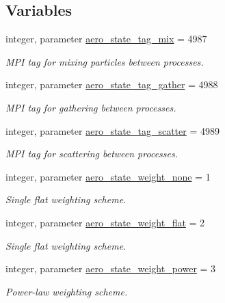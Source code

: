 \subsection*{Variables}
\begin{DoxyCompactItemize}
\item 
integer, parameter \mbox{\hyperlink{namespacepmc__aero__state_a585d061ace6ecfefa6eaadeb8efbeb5d}{aero\+\_\+state\+\_\+tag\+\_\+mix}} = 4987
\begin{DoxyCompactList}\small\item\em M\+PI tag for mixing particles between processes. \end{DoxyCompactList}\item 
integer, parameter \mbox{\hyperlink{namespacepmc__aero__state_a8016b38f6c38806de95b72ffaecbe212}{aero\+\_\+state\+\_\+tag\+\_\+gather}} = 4988
\begin{DoxyCompactList}\small\item\em M\+PI tag for gathering between processes. \end{DoxyCompactList}\item 
integer, parameter \mbox{\hyperlink{namespacepmc__aero__state_a47a81bec0174512abf54faf2673da5c3}{aero\+\_\+state\+\_\+tag\+\_\+scatter}} = 4989
\begin{DoxyCompactList}\small\item\em M\+PI tag for scattering between processes. \end{DoxyCompactList}\item 
integer, parameter \mbox{\hyperlink{namespacepmc__aero__state_afae976ee50ab7c0415628dd99a6feded}{aero\+\_\+state\+\_\+weight\+\_\+none}} = 1
\begin{DoxyCompactList}\small\item\em Single flat weighting scheme. \end{DoxyCompactList}\item 
integer, parameter \mbox{\hyperlink{namespacepmc__aero__state_a72b0c9b3118a486936fe3c50c4d908f6}{aero\+\_\+state\+\_\+weight\+\_\+flat}} = 2
\begin{DoxyCompactList}\small\item\em Single flat weighting scheme. \end{DoxyCompactList}\item 
integer, parameter \mbox{\hyperlink{namespacepmc__aero__state_a2c80e8cba61697786d2302e44cd041bd}{aero\+\_\+state\+\_\+weight\+\_\+power}} = 3
\begin{DoxyCompactList}\small\item\em Power-\/law weighting scheme. \end{DoxyCompactList}\item 

\end{DoxyCompactItemize}
